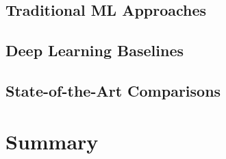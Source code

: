 \subsection{Traditional ML Approaches}

\subsection{Deep Learning Baselines}

\subsection{State-of-the-Art Comparisons}

\section{Summary}
